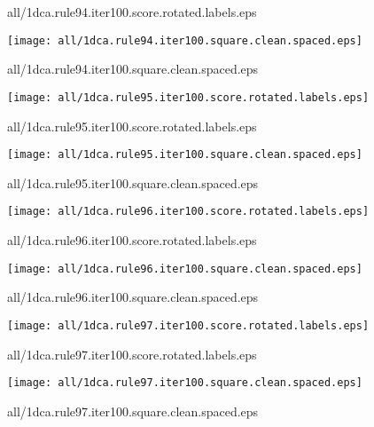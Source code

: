 \documentclass{article}
\begin{document}
{\footnotesize all/1dca.rule94.iter100.score.rotated.labels.eps}
\begin{center}
\begin{minipage}{\textwidth}
\texttt{[image: all/1dca.rule94.iter100.square.clean.spaced.eps]}
\end{minipage}
\end{center}
{\footnotesize all/1dca.rule94.iter100.square.clean.spaced.eps}
\begin{center}
\begin{minipage}{\textwidth}
\texttt{[image: all/1dca.rule95.iter100.score.rotated.labels.eps]}
\end{minipage}
\end{center}
{\footnotesize all/1dca.rule95.iter100.score.rotated.labels.eps}
\begin{center}
\begin{minipage}{\textwidth}
\texttt{[image: all/1dca.rule95.iter100.square.clean.spaced.eps]}
\end{minipage}
\end{center}
{\footnotesize all/1dca.rule95.iter100.square.clean.spaced.eps}
\begin{center}
\begin{minipage}{\textwidth}
\texttt{[image: all/1dca.rule96.iter100.score.rotated.labels.eps]}
\end{minipage}
\end{center}
{\footnotesize all/1dca.rule96.iter100.score.rotated.labels.eps}
\begin{center}
\begin{minipage}{\textwidth}
\texttt{[image: all/1dca.rule96.iter100.square.clean.spaced.eps]}
\end{minipage}
\end{center}
{\footnotesize all/1dca.rule96.iter100.square.clean.spaced.eps}
\begin{center}
\begin{minipage}{\textwidth}
\texttt{[image: all/1dca.rule97.iter100.score.rotated.labels.eps]}
\end{minipage}
\end{center}
{\footnotesize all/1dca.rule97.iter100.score.rotated.labels.eps}
\begin{center}
\begin{minipage}{\textwidth}
\texttt{[image: all/1dca.rule97.iter100.square.clean.spaced.eps]}
\end{minipage}
\end{center}
{\footnotesize all/1dca.rule97.iter100.square.clean.spaced.eps}
\end{document}
